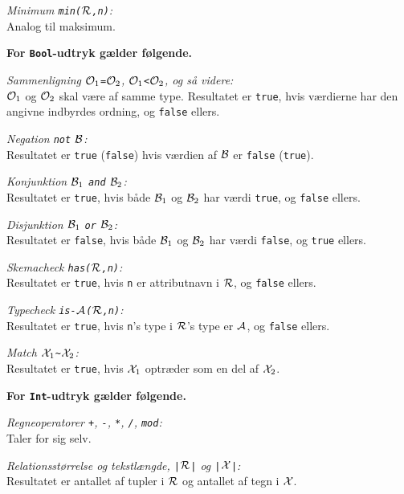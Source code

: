 {\em Minimum \verb"min("$\cal R$\verb",n)":}\\
Analog til maksimum.

{\bf For \verb"Bool"-udtryk g\ae{}lder f\o{}lgende.}

{\em Sammenligning ${\cal O}_1$\verb"="${\cal O}_2$, ${\cal O}_1$\verb"<"${\cal O}_2$, og s\aa{} videre:}\\
${\cal O}_1$ og ${\cal O}_2$ skal v\ae{}re af samme type. Resultatet er
\verb"true", hvis v\ae{}rdierne har den angivne indbyrdes ordning, og
\verb"false" ellers.

{\em Negation \verb"not" $\cal B$:}\\
Resultatet er \verb"true" (\verb"false") hvis v\ae{}rdien af 
$\cal B$ er \verb"false" (\verb"true").

{\em Konjunktion ${\cal B}_1$ \verb"and" ${\cal B}_2$:}\\
Resultatet er \verb"true", hvis b\aa{}de ${\cal B}_1$ og ${\cal B}_2$
har v\ae{}rdi \verb"true", og \verb"false" ellers.

{\em Disjunktion ${\cal B}_1$ \verb"or" ${\cal B}_2$:}\\
Resultatet er \verb"false", hvis b\aa{}de ${\cal B}_1$ og ${\cal B}_2$
har v\ae{}rdi \verb"false", og \verb"true" ellers.

{\em Skemacheck \verb"has("$\cal R$\verb",n)":}\\
Resultatet er \verb"true", hvis \verb"n" er attributnavn i $\cal R$,
og \verb"false" ellers.

{\em Typecheck \verb"is-"$\cal A$\verb"("$\cal R$\verb",n)":}\\
Resultatet er \verb"true", hvis \verb"n"'s type i $\cal R$'s type
er $\cal A$, og \verb"false" ellers.

{\em Match ${\cal X}_1$\verb"~"${\cal X}_2$:}\\
Resultatet er \verb"true", hvis ${\cal X}_1$ optr\ae{}der som en del af ${\cal
X}_2$.

{\bf For \verb"Int"-udtryk g\ae{}lder f\o{}lgende.}

{\em Regneoperatorer \verb"+", \verb"-", \verb"*", \verb"/", \verb"mod":}\\
Taler for sig selv.

{\em Relationsst\o{}rrelse og tekstl\ae{}ngde, \verb"|"$\cal R$\verb"|" og
\verb"|"$\cal X$\verb"|":}\\
Resultatet er antallet af tupler i $\cal R$ og antallet af tegn i
$\cal X$.

